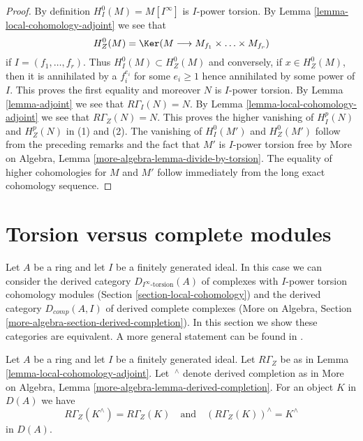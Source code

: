 \begin{proof}
By definition $H^0_I(M) = M[I^\infty]$ is $I$-power torsion.
By Lemma \ref{lemma-local-cohomology-adjoint} we see that
$$
H^0_Z(M) = \Ker(M \longrightarrow M_{f_1} \times \ldots \times M_{f_r})
$$
if $I = (f_1, \ldots, f_r)$. Thus $H^0_I(M) \subset H^0_Z(M)$ and
conversely, if $x \in H^0_Z(M)$, then it is annihilated by a $f_i^{e_i}$
for some $e_i \geq 1$ hence annihilated by some power of $I$.
This proves the first equality and moreover $N$ is $I$-power torsion.
By Lemma \ref{lemma-adjoint} we see that $R\Gamma_I(N) = N$.
By Lemma \ref{lemma-local-cohomology-adjoint} we see that $R\Gamma_Z(N) = N$.
This proves the higher vanishing of $H^p_I(N)$ and $H^p_Z(N)$ in (1) and (2).
The vanishing of $H^0_I(M')$ and $H^0_Z(M')$ follow from the preceding
remarks and the fact that $M'$ is $I$-power torsion free by
More on Algebra, Lemma \ref{more-algebra-lemma-divide-by-torsion}.
The equality of higher cohomologies for $M$ and $M'$ follow
immediately from the long exact cohomology sequence.
\end{proof}









\section{Torsion versus complete modules}
\label{section-torsion-and-complete}

\noindent
Let $A$ be a ring and let $I$ be a finitely generated ideal.
In this case we can consider the derived category
$D_{I^\infty\text{-torsion}}(A)$ of complexes
with $I$-power torsion cohomology modules
(Section \ref{section-local-cohomology})
and the derived category
$D_{comp}(A, I)$ of derived complete complexes
(More on Algebra, Section \ref{more-algebra-section-derived-completion}).
In this section we show these categories are equivalent.
A more general statement can be found in
\cite{Dwyer-Greenlees}.

\begin{lemma}
\label{lemma-complete-and-local}
Let $A$ be a ring and let $I$ be a finitely generated ideal.
Let $R\Gamma_Z$ be as in Lemma \ref{lemma-local-cohomology-adjoint}.
Let ${\ }^\wedge$ denote derived completion as in
More on Algebra, Lemma \ref{more-algebra-lemma-derived-completion}.
For an object $K$ in $D(A)$ we have
$$
R\Gamma_Z(K^\wedge) = R\Gamma_Z(K)
\quad\text{and}\quad
(R\Gamma_Z(K))^\wedge = K^\wedge
$$
in $D(A)$.
\end{lemma}

